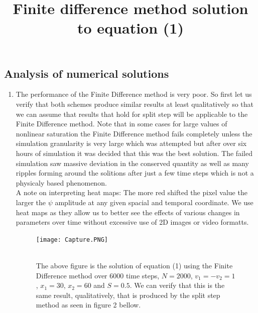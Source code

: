 \documentclass{article}
\begin{document}
\subsection{Analysis of numerical solutions}
\begin{enumerate}
\item

The performance of the Finite Difference method is very poor. So first let us verify that both schemes produce similar results at least qualitatively so that we can assume that results that hold for split step will be applicable to the Finite Difference method. Note that in some cases for large values of nonlinear saturation the Finite Difference method fails completely unless the simulation granularity is very large which was attempted but after over six hours of simulation it was decided that this was the best solution. The failed simulation saw massive deviation in the conserved quantity as well as many ripples forming around the solitions after just a few time steps which is not a physicaly based phenomenon. \\
A note on interpreting heat maps: The more red shifted the pixel value the larger the $\psi$ amplitude at any given spacial and temporal coordinate. We use heat maps as they allow us to better see the effects of various changes in parameters over time without excessive use of 2D images or video formatts. 

\begin{figure}[h!]

\title{Finite difference method solution to equation (1)\\}
\texttt{[image: Capture.PNG]}
\caption{\\The above figure is the solution of equation (1) using the Finite Difference method over 6000 time steps, $N = 2000$, $v_1=-v_2= 1$, $x_1=30$, $x_2=60$ and $S=0.5$. We can verify that this is the same result, qualitatively, that is produced by the split step method as seen in figure 2 bellow. }
\end{figure}



\end{enumerate}
\end{document}
